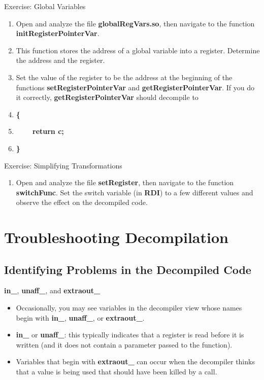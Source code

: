 \documentclass{beamer}
\begin{document}
\begin{frame}
\begin{block}{Exercise: Global Variables}
\begin{enumerate}
\item Open and analyze the file \textbf{globalRegVars.so}, then navigate to the function \textbf{initRegisterPointerVar}.
\item This function stores the address of a global variable into a register.  Determine the address and the register.
\item Set the value of the register to be the address at the beginning of the functions \textbf{setRegisterPointerVar} and \textbf{getRegisterPointerVar}. If you do it correctly,
\textbf{getRegisterPointerVar} should decompile to
\item[]\textbf{\{}
\item[]\textbf{~~~~return c;}
\item[]\textbf{\}}
\end{enumerate}
\end{block}
\end{frame}

\begin{frame}
\begin{block}{Exercise: Simplifying Transformations}
\begin{enumerate}
\item Open and analyze the file \textbf{setRegister}, then navigate to the function \textbf{switchFunc}.  Set the switch variable (in \textbf{RDI}) to a few different values and
observe the effect on the decompiled code.
\end{enumerate}
\end{block}
\end{frame}


\section{Troubleshooting Decompilation}

\subsection{Identifying Problems in the Decompiled Code}

\begin{frame}
\begin{block}{\textbf{in\_}, \textbf{unaff\_}, and \textbf{extraout\_}}
\begin{itemize}
\item Occasionally, you may see variables in the decompiler view whose names begin with \textbf{in\_}, \textbf{unaff\_}, or \textbf{extraout\_}.
\item \textbf{in\_} or \textbf{unaff\_}: this typically indicates that a register is read before it is written (and it does not contain a parameter passed to the function).
\item Variables that begin with \textbf{extraout\_} can occur when the decompiler thinks that a value is being used that should have been killed by a call.
\end{itemize}
\end{block}
\end{frame}
\end{document}
